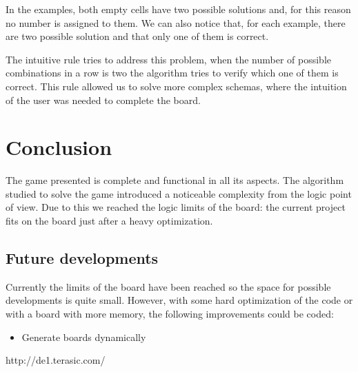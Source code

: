 \documentclass[12pt]{report}
\begin{document}
In the examples, both empty cells have two possible solutions and, for this
reason no number is assigned to them. We can also notice that, for each
example, there are two possible solution and that only one of them is
correct.

The intuitive rule tries to address this problem, when the number of
possible combinations in a row is two the algorithm tries to verify which
one of them is correct. This rule allowed us to solve more complex
schemas, where the intuition of the user was needed to complete the board.

\chapter*{Conclusion}

The game presented is complete and functional in all its aspects. The
algorithm studied to solve the game introduced a noticeable complexity
from the logic point of view. Due to this we reached the logic limits of
the board: the current project fits on the board just after a heavy
optimization.

\section*{Future developments}

Currently the limits of the board have been reached so the space for
possible developments is quite small. However, with some hard optimization
of the code or with a board with more memory, the following improvements
could be coded:

\begin{itemize}

    \item Generate boards dynamically

\end{itemize}

\renewcommand{\bibname}{References}
\begin{thebibliography}{100}

 http://de1.terasic.com/

\end{thebibliography}
\end{document}
